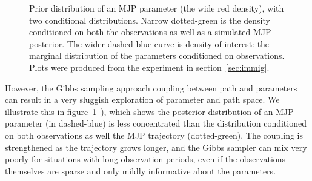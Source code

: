 \begin{figure}
  \begin{minipage}[hp]{0.64\linewidth}
  \caption{Prior distribution of an MJP parameter (the wide red density), with two conditional distributions. 
    Narrow dotted-green is the density conditioned on both the observations as well as a simulated MJP posterior. 
    The wider dashed-blue curve is density of interest: the marginal distribution of the parameters conditioned on observations. 
  Plots were produced from the experiment in section~\ref{sec:immig}.}
     \label{fig:hist}
  \end{minipage}
  \end{figure}
  However, the Gibbs sampling approach coupling between path and parameters can result in a very sluggish exploration of parameter and path space. 
  We illustrate this in figure~\ref{fig:hist}~\citep[inspired by][]{papaspiliopoulos2007general}), which shows the posterior distribution of an MJP parameter (in dashed-blue) is less concentrated than the distribution conditioned on both observations as well the MJP trajectory (dotted-green). 
The coupling is strengthened as the trajectory grows longer, and the Gibbs sampler can mix very poorly for situations with long observation periods, even if the observations themselves are sparse and only mildly informative about the parameters.

